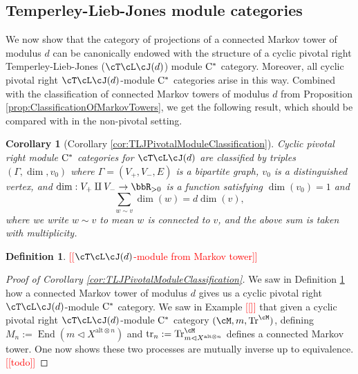 \documentclass[11pt]{article}
\theoremstyle{plain}
\newtheorem*{cor*}{Corollary}
\theoremstyle{definition}
\newtheorem{defn}[thm]{Definition}
\DeclareMathOperator{\End}{End}
\DeclareMathOperator{\Tr}{Tr}
\DeclareMathOperator{\tr}{tr}
\newcommand{\Cstar}{\rm{C^*}}
\newcommand{\nn}[1]{\textcolor{red}{[[#1]]}}
\begin{document}
\subsection{Temperley-Lieb-Jones module categories} 
\label{sec:TLJmodules}

We now show that the category of projections of a connected Markov tower of modulus $d$ can be canonically endowed with the structure of a cyclic pivotal right Temperley-Lieb-Jones ($\cT\cL\cJ(d)$) module $\Cstar$ category.
Moreover, all cyclic pivotal right $\cT\cL\cJ(d)$-module $\Cstar$ categories arise in this way.
Combined with the classification of connected Markov towers of modulus $d$ from Proposition \ref{prop:ClassificationOfMarkovTowers}, we get the following result, which should be compared with \cite{MR3420332} in the non-pivotal setting.

\begin{cor*}[Corollary \ref{cor:TLJPivotalModuleClassification}]
Cyclic pivotal right module $\Cstar$ categories for $\cT\cL\cJ(d)$ are classified by triples $(\Gamma, \dim, v_0)$ where $\Gamma=(V_+, V_- , E)$ is a bipartite graph, $v_0$ is a distinguished vertex, and $\dim : V_+\amalg V_- \to \bbR_{>0}$ is a function satisfying $\dim(v_0) = 1$ and
$$
\sum_{w\sim v} \dim(w) = d \dim(v),
$$
where we write $w\sim v$ to mean $w$ is connected to $v$, and the above sum is taken with multiplicity.
\end{cor*}

\begin{defn}
\label{def:ModuleFromMarkovTower}
\nn{$\cT\cL\cJ(d)$-module from Markov tower}
\end{defn}

\begin{proof}[Proof of Corollary \ref{cor:TLJPivotalModuleClassification}]
We saw in Definition \ref{def:ModuleFromMarkovTower} how a connected Markov tower of modulus $d$ gives us a cyclic pivotal right $\cT\cL\cJ(d)$-module $\Cstar$ category.
We saw in Example \nn{} that given a cyclic pivotal right $\cT\cL\cJ(d)$-module $\Cstar$ category $(\cM, m,\Tr^\cM)$, 
defining $M_n := \End(m \vartriangleleft X^{\text{alt}\otimes n})$ and $\tr_n := \Tr^\cM_{m \vartriangleleft X^{\text{alt}\otimes n}}$ defines a connected Markov tower.
One now shows these two processes are mutually inverse up to equivalence.
\nn{todo}
\end{proof}
\end{document}
